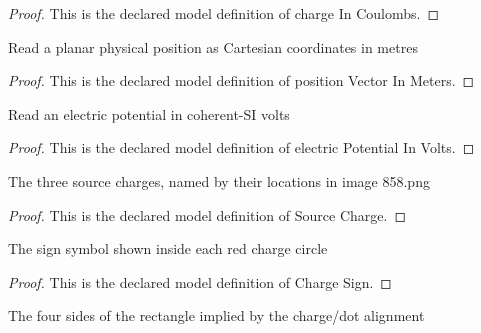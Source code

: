 \begin{proof}
  This is the declared model definition of charge In Coulombs.
\end{proof}
\begin{definition}
  \label{def:physics:phyx-mini-0858:phyxminiproblems-problemphyxmini0858-positionvectorinmeters}
  Read a planar physical position as Cartesian coordinates in metres
\end{definition}
\begin{proof}
  This is the declared model definition of position Vector In Meters.
\end{proof}
\begin{definition}
  \label{def:physics:phyx-mini-0858:phyxminiproblems-problemphyxmini0858-electricpotentialinvolts}
  Read an electric potential in coherent-SI volts
\end{definition}
\begin{proof}
  This is the declared model definition of electric Potential In Volts.
\end{proof}
\begin{definition}
  \label{def:physics:phyx-mini-0858:phyxminiproblems-problemphyxmini0858-sourcecharge}
  The three source charges, named by their locations in image 858.png
\end{definition}
\begin{proof}
  This is the declared model definition of Source Charge.
\end{proof}
\begin{definition}
  \label{def:physics:phyx-mini-0858:phyxminiproblems-problemphyxmini0858-chargesign}
  The sign symbol shown inside each red charge circle
\end{definition}
\begin{proof}
  This is the declared model definition of Charge Sign.
\end{proof}
\begin{definition}
  \label{def:physics:phyx-mini-0858:phyxminiproblems-problemphyxmini0858-rectangleside}
  The four sides of the rectangle implied by the charge/dot alignment
\end{definition}
